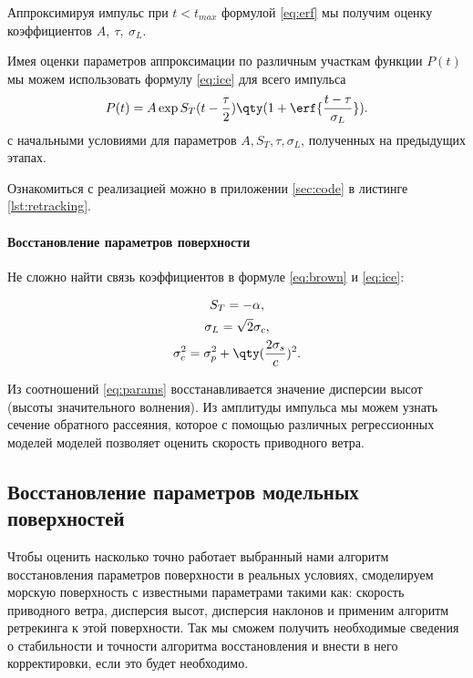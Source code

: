 Аппроксимируя импульс при $t<t_{max}$ формулой \eqref{eq:erf} мы получим оценку
коэффициентов $A,~\tau,~\sigma_L$. 


 Имея оценки параметров аппроксимации по различным
участкам функции $P(t)$ мы можем использовать формулу  \eqref{eq:ice} для всего
импульса 
\begin{equation}
    P(t) = A \exp{ S_T (t - \frac{\tau}{2})} \qty(1 + \erf{\frac{t-
    \tau}{\sigma_L}}).
\end{equation}
с начальными условиями для параметров $A, S_T, \tau, \sigma_L$, полученных на
предыдущих этапах. 



Ознакомиться с реализацией можно в приложении  \ref{sec:code} в листинге \ref{lst:retracking}. 




\paragraph{Восстановление параметров поверхности}%
Не сложно найти связь коэффициентов в формуле \eqref{eq:brown} и \eqref{eq:ice}:

\begin{equation}
    \label{eq:params}
    \begin{gathered}
        S_T = - \alpha,\\
        \sigma_L = \sqrt 2 \sigma_c,\\
        \sigma_c^2 = \sigma_p^2 + \qty(\frac{2\sigma_s}{c})^2.
    \end{gathered}
\end{equation}

Из соотношений \eqref{eq:params} восстанавливается значение дисперсии высот
(высоты значительного  волнения). 
Из амплитуды импульса мы можем узнать сечение обратного рассеяния, которое с
помощью различных регрессионных моделей моделей позволяет оценить скорость приводного ветра.

\subsection{Восстановление параметров модельных поверхностей}
\label{sub:retracking_model}

Чтобы оценить насколько точно работает выбранный нами алгоритм восстановления
параметров поверхности в реальных условиях, смоделируем морскую поверхность с
известными параметрами такими как: скорость приводного ветра, дисперсия высот,
дисперсия наклонов и применим алгоритм ретрекинга к этой поверхности. Так мы
сможем получить необходимые сведения о стабильности и точности алгоритма
восстановления и внести в него корректировки, если это будет необходимо.

